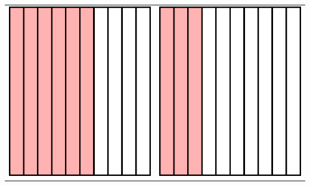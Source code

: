 \documentclass{standalone}
\begin{document}
\begin{tabular}{ll}
\includegraphics{005a.pdf}\vspace{3cm}\hspace{3cm} & \includegraphics{005b.pdf} \\

\end{tabular}
\end{document}
